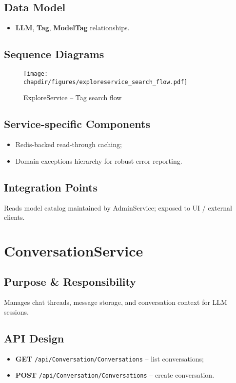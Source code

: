 \subsection{Data Model}
\begin{itemize}
  \item \textbf{LLM}, \textbf{Tag}, \textbf{ModelTag} relationships.
\end{itemize}

\subsection{Sequence Diagrams}
\begin{sidewaysfigure}[h]
    \centering
    \texttt{[image: \\chapdir/figures/exploreservice\_search\_flow.pdf]}
    \caption{ExploreService – Tag search flow}
\end{sidewaysfigure}

\subsection{Service-specific Components}
\begin{itemize}
  \item Redis-backed read-through caching;
  \item Domain exceptions hierarchy for robust error reporting.
\end{itemize}

\subsection{Integration Points}
Reads model catalog maintained by AdminService; exposed to UI / external clients.

\section{ConversationService}
\subsection{Purpose \& Responsibility}
Manages chat threads, message storage, and conversation context for LLM sessions.

\subsection{API Design}
\begin{itemize}
  \item \textbf{GET} \texttt{/api/Conversation/Conversations} – list conversations;
  \item \textbf{POST} \texttt{/api/Conversation/Conversations} – create conversation.
\end{itemize}

